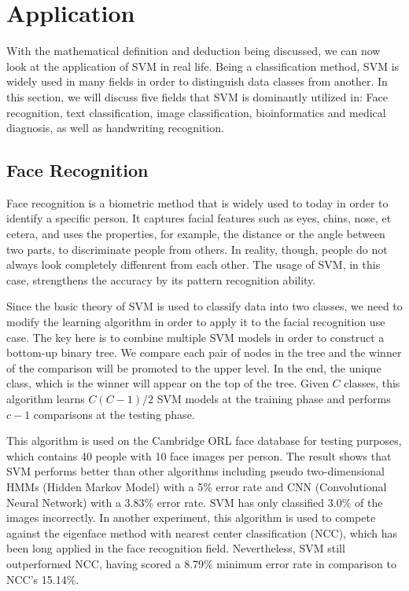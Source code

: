 \section{Application}
With the mathematical definition and deduction being discussed, we can now
look at the application of SVM in real life. Being a classification method,
SVM is widely used in many fields in order to distinguish data classes from
another. In this section, we will discuss five fields that SVM is dominantly
utilized in: Face recognition, text classification, image classification,
bioinformatics and medical diagnosis, as well as handwriting recognition.

\subsection*{Face Recognition}
Face recognition is a biometric method that is widely used to today in order
to identify a specific
person. It captures facial features such as eyes, chins, nose, et cetera, and
uses the properties, for example, the distance or the angle between two parts, 
to discriminate people from others. In reality, though, people do not always
look completely diffenrent from each other. The usage of SVM, 
in this case, strengthens the accuracy by its pattern recognition ability.

Since the basic theory of SVM is used to classify data into two classes, we
need to modify the learning algorithm in order to apply it to the facial
recognition use case. The key here is to combine multiple SVM models in order
to construct a bottom-up binary tree. We compare each pair of nodes in the
tree and the winner of the comparison will be promoted to the upper level.
In the end, the unique class, which is the winner will appear on the top of 
the tree. Given $C$ classes, this algorithm learns $C(C-1)/2$ SVM models at
the training phase and performs $c-1$ comparisons at the testing phase.

This algorithm is used on the Cambridge ORL face database for testing purposes, 
which contains 40 people with 10 face images per person.
The result shows that SVM performs better than other algorithms including
pseudo two-dimensional HMMs (Hidden Markov Model) with a 5\% error rate 
and CNN (Convolutional Neural Network) with a 3.83\% error rate. SVM has
only classified 3.0\% of the images incorrectly. In another experiment,
this algorithm is used to compete against the eigenface method
with nearest center classification (NCC), which has been long applied
in the face recognition field. Nevertheless, SVM still outperformed NCC,
having scored a 8.79\% minimum error rate in comparison to NCC's 15.14\%.
\cite{face-recognition}

